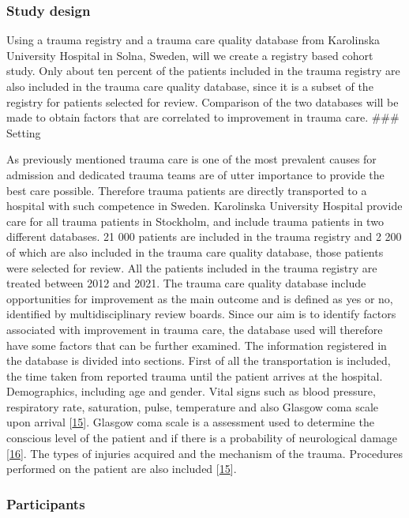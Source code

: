 \documentclass[
]{article}
\begin{document}
\hypertarget{study-design}{%
\subsubsection{Study design}\label{study-design}}

Using a trauma registry and a trauma care quality database from
Karolinska University Hospital in Solna, Sweden, will we create a
registry based cohort study. Only about ten percent of the patients
included in the trauma registry are also included in the trauma care
quality database, since it is a subset of the registry for patients
selected for review. Comparison of the two databases will be made to
obtain factors that are correlated to improvement in trauma care. \#\#\#
Setting

As previously mentioned trauma care is one of the most prevalent causes
for admission and dedicated trauma teams are of utter importance to
provide the best care possible. Therefore trauma patients are directly
transported to a hospital with such competence in Sweden. Karolinska
University Hospital provide care for all trauma patients in Stockholm,
and include trauma patients in two different databases. 21 000 patients
are included in the trauma registry and 2 200 of which are also included
in the trauma care quality database, those patients were selected for
review. All the patients included in the trauma registry are treated
between 2012 and 2021. The trauma care quality database include
opportunities for improvement as the main outcome and is defined as yes
or no, identified by multidisciplinary review boards. Since our aim is
to identify factors associated with improvement in trauma care, the
database used will therefore have some factors that can be further
examined. The information registered in the database is divided into
sections. First of all the transportation is included, the time taken
from reported trauma until the patient arrives at the hospital.
Demographics, including age and gender. Vital signs such as blood
pressure, respiratory rate, saturation, pulse, temperature and also
Glasgow coma scale upon arrival
{[}\protect\hyperlink{ref-Swetrau2020}{15}{]}. Glasgow coma scale is a
assessment used to determine the conscious level of the patient and if
there is a probability of neurological damage
{[}\protect\hyperlink{ref-Teasdale2014}{16}{]}. The types of injuries
acquired and the mechanism of the trauma. Procedures performed on the
patient are also included {[}\protect\hyperlink{ref-Swetrau2020}{15}{]}.

\hypertarget{participants}{%
\subsubsection{Participants}\label{participants}}
\end{document}
